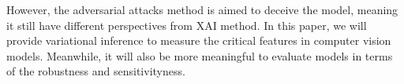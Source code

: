 \documentclass[12pt]{article}
\begin{document}
However, the adversarial attacks method is aimed to deceive the model, meaning it still have different perspectives from XAI method. In this paper, we will provide variational inference to measure the critical features in computer vision models. 
Meanwhile, it will also be more meaningful to evaluate models in terms of the robustness and sensitivityness. \\

\newpage
\begin{footnotesize} %
\singlespacing %
\setlength{\bibsep}{5pt} %
\thispagestyle{empty} %
\end{footnotesize} %
\end{document}
